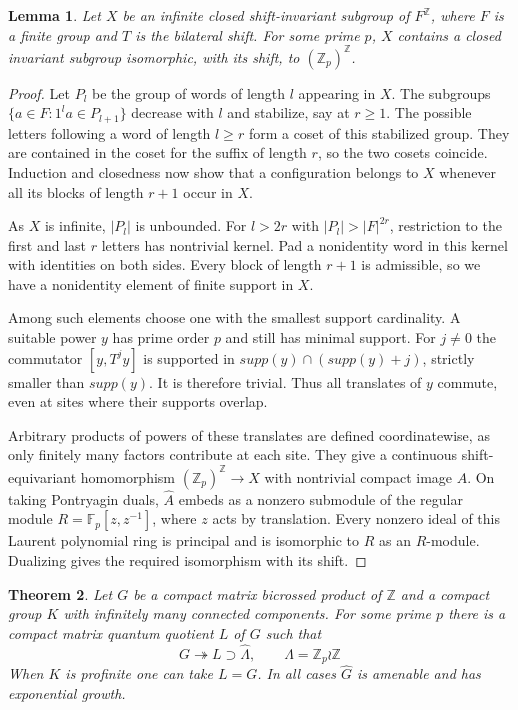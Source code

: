 \documentclass[11pt,a4paper]{article}
\newtheorem{thm}{Theorem}[section]
\newtheorem{lem}[thm]{Lemma}
\theoremstyle{remark}
\begin{document}
\begin{lem}\label{lampshift}
Let $X$ be an infinite closed shift-invariant subgroup of $F^{\mathbb Z}$,
where $F$ is a finite group and $T$ is the bilateral shift. For some
prime $p$, $X$ contains a closed invariant subgroup isomorphic, with its
shift, to $(\mathbb Z_p)^{\mathbb Z}$.
\end{lem}
\begin{proof}
Let $P_l$ be the group of words of length $l$ appearing in $X$. The
subgroups $\{a\in F:1^la\in P_{l+1}\}$ decrease with $l$ and stabilize,
say at $r\ge1$. The possible letters following a word of length $l\ge r$
form a coset of this stabilized group. They are contained in the coset
for the suffix of length $r$, so the two cosets coincide. Induction and
closedness now show that a configuration belongs to $X$ whenever all its
blocks of length $r+1$ occur in $X$.

As $X$ is infinite, $|P_l|$ is unbounded. For $l>2r$ with
$|P_l|>|F|^{2r}$, restriction to the first and last $r$ letters has
nontrivial kernel. Pad a nonidentity word in this kernel with identities
on both sides. Every block of length $r+1$ is admissible, so we have a
nonidentity element of finite support in $X$.

Among such elements choose one with the smallest support cardinality.
A suitable power $y$ has prime order $p$ and still has minimal support.
For $j\ne0$ the commutator $[y,T^jy]$ is supported in
$supp(y)\cap(supp(y)+j)$, strictly smaller
than $supp(y)$. It is therefore trivial. Thus all translates
of $y$ commute, even at sites where their supports overlap.

Arbitrary products of powers of these translates are defined coordinatewise,
as only finitely many factors contribute at each site. They give a continuous
shift-equivariant homomorphism $(\mathbb Z_p)^{\mathbb Z}\to X$ with nontrivial
compact image $A$. On taking Pontryagin duals, $\widehat A$ embeds as a
nonzero submodule of the regular module $R=\mathbb F_p[z,z^{-1}]$,
where $z$ acts by translation. Every nonzero ideal of this Laurent
polynomial ring is principal and is isomorphic to $R$ as an $R$-module.
Dualizing gives the required isomorphism with its shift.
\end{proof}

\begin{thm}\label{cycliclamps}
Let $G$ be a compact matrix bicrossed product of $\mathbb Z$ and a compact
group $K$ with infinitely many connected components. For some prime $p$
there is a compact matrix quantum quotient $L$ of $G$ such that
\[
 G\twoheadrightarrow L\supset\widehat\Lambda,\qquad \Lambda=\mathbb Z_p\wr\mathbb Z
\]
When $K$ is profinite one can take $L=G$. In all cases $\widehat G$
is amenable and has exponential growth.
\end{thm}
\end{document}
